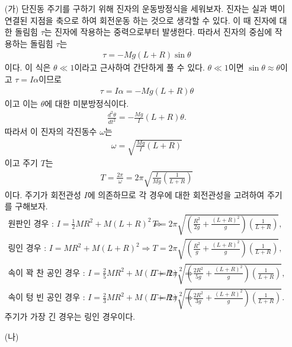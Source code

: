 \documentclass[floatfix,nofootinbib,superscriptaddress,fleqn]{revtex4-2}
\begin{document}
\begin{itemize}
  \item[(가)] 
  단진동 주기를 구하기 위해 진자의 운동방정식을 세워보자. 진자는 실과 벽이 연결된 지점을
  축으로 하여 회전운동 하는 것으로 생각할 수 있다. 이 때 진자에 대한 돌림힘 $\tau$는
  진자에 작용하는 중력으로부터 발생한다. 따라서 진자의 중심에 작용하는 돌림힘 $\tau$는
  \begin{align}\label{}
    \tau = -Mg\left(L+R\right)\sin\theta 
  \end{align}
  이다. 이 식은 $\theta\ll 1$이라고 근사하여 간단하게 풀 수 있다. $\theta\ll 1$이면
  $\sin\theta\approx\theta$이고 $\tau = I\alpha$이므로
  \begin{align}\label{}
    \tau = I\alpha = -Mg\left(L+R\right)\theta 
  \end{align}
  이고 이는 $\theta$에 대한 미분방정식이다.
  \begin{align}\label{}
    \frac{d^2\theta}{dt^2}=-\frac{Mg}{I}\left(L+R\right)\theta.
  \end{align}
  따라서 이 진자의 각진동수 $\omega$는
  \begin{align}\label{}
    \omega = \sqrt{\frac{Mg}{I}\left(L+R\right)}
  \end{align}
  이고 주기 $T$는
  \begin{align}\label{eq:4-T}
    T =\frac{2\pi}{\omega}= 2\pi\sqrt{\frac{I}{Mg}\left(\frac{1}{L+R}\right)}
  \end{align}
  이다. 주기가 회전관성 $I$에 의존하므로 각 경우에 대한 회전관성을 고려하여 주기를 구해보자.
  \begin{align*}
  \text{원판인 경우 : }         
   I= \frac{1}{2}MR^2 + M(L+R)^2\Longrightarrow&
   T = 2\pi\sqrt{\left(\frac{R^2}{2g}
   +\frac{(L+R)^2}{g}\right)\left(\frac{1}{L+R}\right)},\\
  \text{링인 경우 : }         
   I= MR^2 + M(L+R)^2 \Longrightarrow&          
  T = 2\pi\sqrt{\left(\frac{ R^2}{g}
  +\frac{(L+R)^2}{g}\right)\left(\frac{1}{L+R}\right)},\\
  \text{속이 꽉 찬 공인 경우 : }
   I= \frac{2}{5}MR^2 + M(L+R)^2 \Longrightarrow&
   T = 2\pi\sqrt{\left(\frac{2R^2}{5g}+\frac{(L+R)^2}{g}\right)
   \left(\frac{1}{L+R}\right)},\\
  \text{속이 텅 빈 공인 경우 : }
   I= \frac{2}{3}MR^2 + M(L+R)^2 \Longrightarrow&
   T = 2\pi\sqrt{\left(\frac{2R^2 }{3g}+\frac{(L+R)^2}{g}\right)
   \left(\frac{1}{L+R}\right)}.
  \end{align*}
  주기가 가장 긴 경우는 링인 경우이다.
  \item[(나)] 

\end{itemize}
\end{document}

